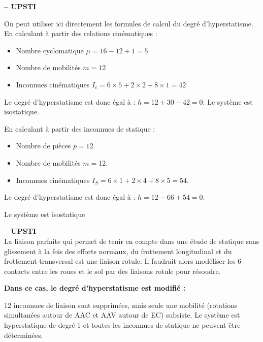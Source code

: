 \ifprof
\begin{corrige}\textbf{ -- UPSTI}\\ 
\vspace{-.3cm}
\begin{multicols}{2}
On peut utiliser ici directement les formules de calcul du degré d’hyperstatisme.
En calculant à partir des relations cinématiques :
\begin{itemize}
\item Nombre cyclomatique $\mu =16-12+1=5$
\item Nombre de mobilités $m=12$
\item Inconnues cinématiques $I_c=6\times 5+2\times 2+8\times 1=42$
\end{itemize}
Le degré d’hyperstatisme est donc égal à : $h=12+30-42=0$.
Le système est isostatique.

En calculant à partir des inconnues de statique :
\begin{itemize}
\item Nombre de pièces  $p=12$.
\item Nombre de mobilités $m=12$.
\item Inconnues cinématiques $I_S=6\times 1+2\times 4+8\times 5=54$.
\end{itemize}
Le degré d’hyperstatisme est donc égal à : $h=12-66+54=0$.

Le système est isostatique

\end{multicols}
\end{corrige}
\else
\fi

\ifprof
\begin{corrige}\textbf{ -- UPSTI}\\ 
La liaison parfaite qui permet de tenir en compte dans une étude de statique sans glissement  à la fois des efforts normaux, du frottement longitudinal et du frottement transversal est une liaison rotule. Il faudrait alors modéliser les 6 contacts entre les roues et le sol par des liaisons rotule pour résoudre.


\textbf{Dans ce cas, le degré d’hyperstatisme est modifié :}

12 inconnues de liaison sont supprimées, mais seule une mobilité (rotations simultanées autour de AAC et AAV autour de EC) subsiste. Le système est hyperstatique de degré 1 et toutes les inconnues de statique ne peuvent être déterminées. 

\end{corrige}
\else
\fi

